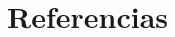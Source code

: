 \documentclass[spanish,12pt,a4paper]{article}
\begin{document}
	\section*{Referencias}
	\begin{multicols}{2}
		\printbibliography
	\end{multicols}
	

	
\end{document}
